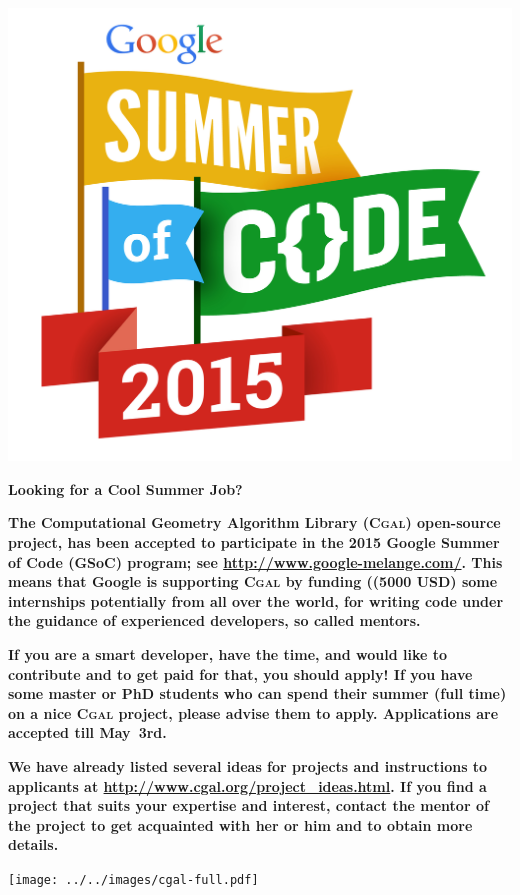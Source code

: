 \documentclass[12pt,a4paper]{article}
\newcommand{\cgal}{\textsc{Cgal}}
\begin{document}
\begin{framed}
  \newlength{\cgalwidth}\setlength{\cgalwidth}{\linewidth}
  \begin{center}
    \includegraphics[width=0.6\cgalwidth]{GoogleSummer_2015logo.jpg}

    \textbf{\Huge Looking for a Cool Summer Job?}
  \end{center}

  \textbf{\large The Computational Geometry Algorithm Library (\cgal{})
    open-source project, has been accepted to participate in the 2015 Google
    Summer of Code (GSoC) program; see \url{http://www.google-melange.com/}.
    This means that Google is supporting \cgal{} by funding ((5000 USD)
    some internships potentially from all over the world, for writing code
    under the guidance of experienced developers, so called mentors.}

  \textbf{{\large If you are a smart developer, have the time, and
    would like to contribute and to get paid for that, you should
    apply! If you have some master or PhD students who can spend their
    summer (full time) on a nice \cgal{} project, please advise them
    to apply.} Applications are accepted till May~3rd.}

  \textbf{\large We have already listed several ideas for projects and
    instructions to applicants at
    \url{http://www.cgal.org/project_ideas.html}. If you find a project
    that suits your expertise and interest, contact the mentor of the
    project to get acquainted with her or him and to obtain more details.}

  \texttt{[image: ../../images/cgal-full.pdf]}
\end{framed}
\end{document}
